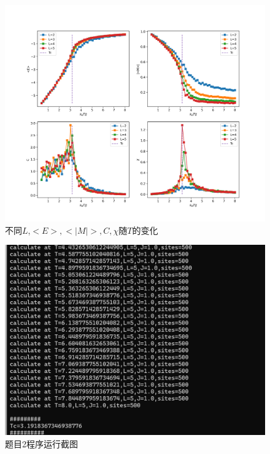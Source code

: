 \documentclass[11pt]{article}
\begin{document}
  \begin{figure}[ht]
    \centering
    \includegraphics[width=1.0\linewidth]{photo/findTc.png}
    \caption{不同$L$,$<E>,<|M|>,C,\chi$随$T$的变化}
    \label{fig:Tc}
  \end{figure}


  \begin{figure}
    \centering
    \includegraphics[width=0.6\linewidth]{photo/figp2.png}
    \caption{题目2程序运行截图}
    \label{fig:p2}
  \end{figure}
\end{document}
